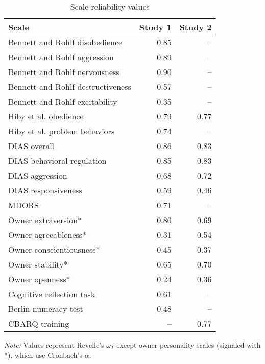 \documentclass[
  pub,floatsintext]{apa6}
\begin{document}
\begin{table}[!h]

\caption{\label{tab:reliability}Scale reliability values}
\centering
\begin{threeparttable}
\begin{tabular}[t]{lrr}
\toprule
Scale & Study 1 & Study 2\\
\midrule
Bennett and Rohlf disobedience & 0.85 & --\\
Bennett and Rohlf aggression & 0.89 & --\\
Bennett and Rohlf nervousness & 0.90 & --\\
Bennett and Rohlf destructiveness & 0.57 & --\\
Bennett and Rohlf excitability & 0.35 & --\\
Hiby et al. obedience & 0.79 & 0.77\\
Hiby et al. problem behaviors & 0.74 & --\\
DIAS overall & 0.86 & 0.83\\
DIAS behavioral regulation & 0.85 & 0.83\\
DIAS aggression & 0.68 & 0.72\\
DIAS responsiveness & 0.59 & 0.46\\
MDORS & 0.71 & --\\
Owner extraversion* & 0.80 & 0.69\\
Owner agreeableness* & 0.31 & 0.54\\
Owner conscientiousness* & 0.45 & 0.37\\
Owner stability* & 0.65 & 0.70\\
Owner openness* & 0.24 & 0.36\\
Cognitive reflection task & 0.61 & --\\
Berlin numeracy test & 0.48 & --\\
CBARQ training & -- & 0.77\\
\bottomrule
\end{tabular}
\begin{tablenotes}
\item \newline\textit{Note: }  Values represent Revelle's $\omega_{T}$ except owner personality scales (signaled with *), which use Cronbach's $\alpha$. 
\end{tablenotes}
\end{threeparttable}
\end{table}

\clearpage
\end{document}
